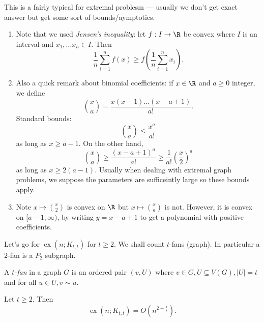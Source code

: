 \documentclass[a4paper]{article}
\DeclareMathOperator{\exx}{ex} %
\begin{document}
This is a fairly typical for extremal problesm --- usually we don't get exact answer but get some sort of bounds/aymptotics.

\begin{remark}\leavevmode
  \begin{enumerate}
  \item Note that we used \emph{Jensen's inequality}: let \(f: I \to \R\) be convex where \(I\) is an interval and \(x_1, \dots x_n \in I\). Then
    \[
      \frac{1}{n} \sum_{i = 1}^n f(x) \geq f(\frac{1}{n} \sum_{i = 1}^n x_i).
    \]
  \item Also a quick remark about binomial coefficients: if \(x \in \R\) and \(a \geq 0\) integer, we define
    \[
      \binom{x}{a} = \frac{x (x - 1) \dots (x - a + 1)}{a!}.
    \]
    Standard bounds:
    \[
      \binom{x}{a} \leq \frac{x^a}{a!}
    \]
    as long as \(x \geq a - 1\). On the other hand,
    \[
      \binom{x}{a} \geq \frac{(x - a + 1)^a}{a!} \geq \frac{1}{a!} \left(\frac{x}{2} \right)^a
    \]
    as long as \(x \geq 2 (a - 1)\). Usually when dealing with extremal graph problems, we suppose the parameters are sufficeintly large so these bounds apply.
  \item Note \(x \mapsto \binom{x}{2}\) is convex on \(\R\) but \(x \mapsto \binom{x}{a}\) is not. However, it is convex on \([a - 1, \infty)\), by writing \(y = x - a + 1\) to get a polynomial with positive coefficients.
  \end{enumerate}
\end{remark}

Let's go for \(\exx(n; K_{t, t})\) for \(t \geq 2\). We shall count \(t\)-fans (graph). In particular a \(2\)-fan is a \(P_2\) subgraph.

\begin{definition}[fan]
  A \emph{\(t\)-fan} in a graph \(G\) is an ordered pair \((v, U)\) where \(v \in G, U \subseteq V(G), |U| = t\) and for all \(u \in U, v \sim u\).
\end{definition}

\begin{theorem}
  \label{thm:forbidden complete bipartite subgraph}
  Let \(t \geq 2\). Then
  \[
    \exx(n; K_{t, t}) = O(n^{2 - \frac{1}{t}}).
  \]
\end{theorem}
\end{document}
